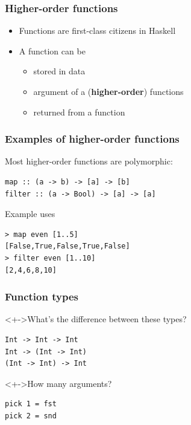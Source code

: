 \documentclass{beamer}
\subtitle{Higher-order functions}
\begin{document}
\begin{frame}
  \titlepage
\end{frame}
\begin{frame}[fragile]
  \frametitle{Higher-order functions}
  \begin{itemize}
  \item Functions are first-class citizens in Haskell
  \item A function can be
    \begin{itemize}
    \item stored in data
    \item argument of a (\textbf{higher-order}) functions
    \item returned from a function
    \end{itemize}
  \end{itemize}
\end{frame}
\begin{frame}[fragile]
  \frametitle{Examples of higher-order functions}

  \begin{block}{Most higher-order functions are polymorphic:}
\begin{verbatim}
map :: (a -> b) -> [a] -> [b]
filter :: (a -> Bool) -> [a] -> [a]
\end{verbatim}
  \end{block}
  \begin{block}{Example uses}
\begin{verbatim}
> map even [1..5]
[False,True,False,True,False]
> filter even [1..10]
[2,4,6,8,10]
\end{verbatim}
  \end{block}
\end{frame}
\begin{frame}[fragile]
  \frametitle{Function types}
  \begin{block}<+->{What's the difference between these types?}
\begin{verbatim}
Int -> Int -> Int
Int -> (Int -> Int)
(Int -> Int) -> Int
\end{verbatim}
  \end{block}
  \begin{block}<+->{How many arguments?}
\begin{verbatim}
pick 1 = fst
pick 2 = snd
\end{verbatim}
  \end{block}  
\end{frame}
\end{document}
